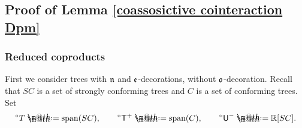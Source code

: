 \documentclass[10pt, reqno]{amsart}
\makeatletter
\numberwithin{subsection}{section}
\numberwithin{subsubsection}{subsection}
\numberwithin{equation}{section} %
\theoremstyle{mystyle}
\theoremstyle{mystyle2}
\theoremstyle{mystyle3}
\newcommand{\sfT}{\mathsf{T}}
\newcommand{\sfU}{\mathsf{U}}
\newcommand\bbR{\mathbb{R}}
\newcommand*{\defeq}{\mathrel{\rlap{%
                     \raisebox{0.3ex}{$\m@th\cdot$}}%
                     \raisebox{-0.3ex}{$\m@th\cdot$}}%
                     =}
\makeatother
\begin{document}
\bigskip


\subsection{Proof of Lemma \ref{coassosictive cointeraction Dpm}}
\label{Appendix Proof of coassociativity}

\subsubsection{Reduced coproducts}

First we consider trees with $\frak{n}$ and $\frak{e}$-decorations, without $\frak{o}$-decoration. Recall that $SC$ is a set of strongly conforming trees and $C$ is a set of conforming trees. Set
\begin{align*}
{^\circ}T \defeq  \text{\rm span}(SC),   \qquad
{^\circ}{\sfT}^+ \defeq  \text{\rm span}(C),   \qquad
{^\circ}{\sfU}^- \defeq  \bbR[SC].
\end{align*}

\end{document}
